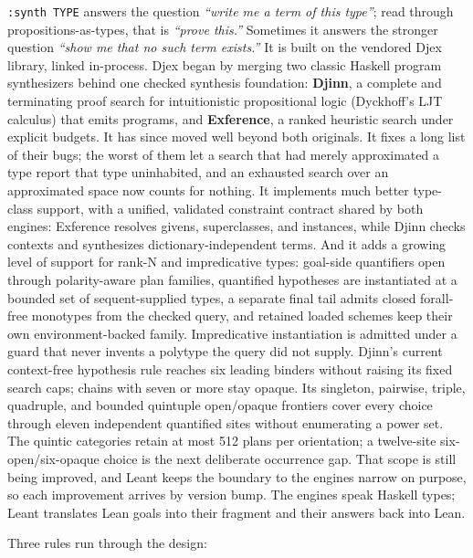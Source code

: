 \documentclass[11pt,oneside]{article}
\newcommand{\code}[1]{\texttt{#1}}
\begin{document}
\code{:synth TYPE} answers the question \emph{``write me a term of
this type''}; read through propositions-as-types, that is
\emph{``prove this.''} Sometimes it answers the stronger question
\emph{``show me that no such term exists.''} It is built on the
vendored Djex library, linked in-process. Djex began by merging two
classic Haskell program synthesizers behind one checked synthesis
foundation: \textbf{Djinn}, a complete and terminating proof
search for intuitionistic propositional logic (Dyckhoff's LJT
calculus) that emits programs, and \textbf{Exference}, a ranked
heuristic search under explicit budgets. It has since moved well
beyond both originals. It fixes a long list of their bugs; the worst
of them let a search that had merely approximated a type report that
type uninhabited, and an exhausted search over an approximated space
now counts for nothing.
It implements much better type-class support, with a unified,
validated constraint contract shared by both engines: Exference
resolves givens, superclasses, and instances, while Djinn checks
contexts and synthesizes dictionary-independent terms. And it adds a
growing level of support for rank-N and impredicative types: goal-side
quantifiers open through polarity-aware plan families, quantified
hypotheses are instantiated at a bounded set of sequent-supplied
types, a separate final tail admits closed forall-free monotypes from
the checked query, and retained loaded schemes keep their own
environment-backed family. Impredicative instantiation is admitted under a
guard that never invents a polytype the query did not supply. Djinn's current
context-free hypothesis rule reaches six leading binders without
raising its fixed search caps; chains with seven or more stay opaque.
Its singleton, pairwise, triple, quadruple, and bounded quintuple open/opaque
frontiers cover every choice through eleven independent quantified sites
without enumerating a power set. The quintic categories retain at most 512
plans per orientation; a twelve-site six-open/six-opaque choice is the next
deliberate occurrence gap. That scope is still being
improved, and Leant keeps the boundary to the engines narrow on
purpose, so each improvement arrives by version bump. The engines speak Haskell types;
Leant translates Lean goals into their fragment and their answers back
into Lean.

Three rules run through the design:
\end{document}
